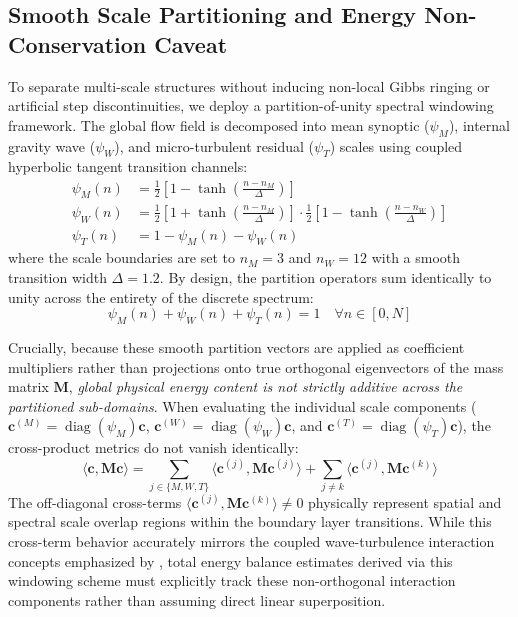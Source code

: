 \subsection{Smooth Scale Partitioning and Energy Non-Conservation Caveat}
\label{sec:methods:partition}

To separate multi-scale structures without inducing non-local Gibbs ringing or artificial step discontinuities, we deploy a partition-of-unity spectral windowing framework. The global flow field is decomposed into mean synoptic ($\psi_M$), internal gravity wave ($\psi_W$), and micro-turbulent residual ($\psi_T$) scales using coupled hyperbolic tangent transition channels:
\begin{align}
  \psi_M(n) &= \frac{1}{2}\left[1 - \tanh\left(\frac{n - n_M}{\Delta}\right)\right] \label{eq:psi_m_def} \\
  \psi_W(n) &= \frac{1}{2}\left[1 + \tanh\left(\frac{n - n_M}{\Delta}\right)\right] \cdot \frac{1}{2}\left[1 - \tanh\left(\frac{n - n_W}{\Delta}\right)\right] \label{eq:psi_w_def} \\
  \psi_T(n) &= 1 - \psi_M(n) - \psi_W(n) \label{eq:psi_t_def}
\end{align}
where the scale boundaries are set to $n_M = 3$ and $n_W = 12$ with a smooth transition width $\Delta = 1.2$. By design, the partition operators sum identically to unity across the entirety of the discrete spectrum:
\begin{equation}
\psi_M(n) + \psi_W(n) + \psi_T(n) = 1 \quad \forall n \in [0, N]
\label{eq:partition_unity}
\end{equation}

Crucially, because these smooth partition vectors are applied as coefficient multipliers rather than projections onto true orthogonal eigenvectors of the mass matrix $\mathbf{M}$, \emph{global physical energy content is not strictly additive across the partitioned sub-domains}. When evaluating the individual scale components ($\mathbf{c}^{(M)} = \operatorname{diag}(\psi_M)\mathbf{c}$, $\mathbf{c}^{(W)} = \operatorname{diag}(\psi_W)\mathbf{c}$, and $\mathbf{c}^{(T)} = \operatorname{diag}(\psi_T)\mathbf{c}$), the cross-product metrics do not vanish identically:
\begin{equation}
\langle \mathbf{c}, \mathbf{M} \mathbf{c} \rangle = \sum_{j \in \{M,W,T\}} \langle \mathbf{c}^{(j)}, \mathbf{M} \mathbf{c}^{(j)} \rangle + \sum_{j \neq k} \langle \mathbf{c}^{(j)}, \mathbf{M} \mathbf{c}^{(k)} \rangle
\label{eq:energy_overlap}
\end{equation}
The off-diagonal cross-terms $\langle \mathbf{c}^{(j)}, \mathbf{M} \mathbf{c}^{(k)} \rangle \neq 0$ physically represent spatial and spectral scale overlap regions within the boundary layer transitions. While this cross-term behavior accurately mirrors the coupled wave-turbulence interaction concepts emphasized by \citet{Sun2015}, total energy balance estimates derived via this windowing scheme must explicitly track these non-orthogonal interaction components rather than assuming direct linear superposition.

